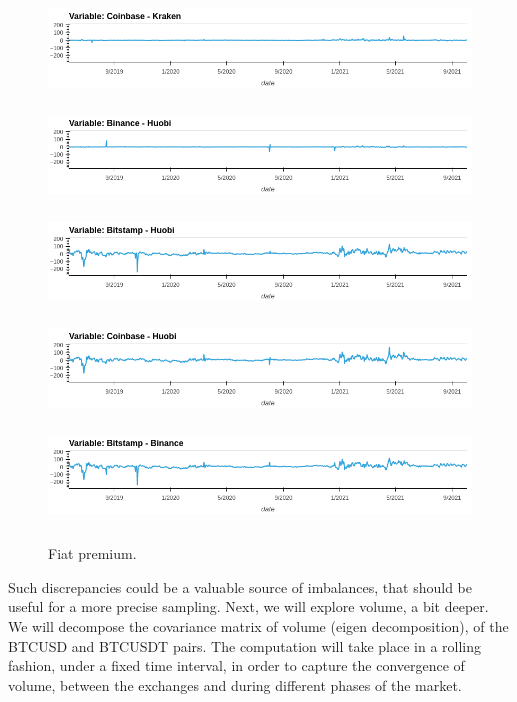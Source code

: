 \documentclass[10pt]{asme2ej}
\begin{document}
\begin{figure}[H]
	\centering
	\includegraphics[width=12cm, height = 2.7cm]{pre1.png} \\
	\includegraphics[width=12cm, height = 2.7cm]{pre2.png} \\
	\includegraphics[width=12cm, height = 2.7cm]{pre3.png} \\
	\includegraphics[width=12cm, height = 2.7cm]{pre4.png} \\
	\includegraphics[width=12cm, height = 2.7cm]{pre5.png} \\
	\caption{Fiat premium.}
	\label{fig:premium}
\end{figure}


Such discrepancies could be a valuable source of imbalances, that should be useful for a more precise sampling. Next, we will explore volume, a bit deeper. We will decompose the covariance matrix of volume (eigen decomposition), of the BTCUSD
and BTCUSDT pairs. The computation will take place in a rolling fashion, under a fixed time interval, in order to capture the convergence of volume, between the exchanges and during different phases of the market.
\end{document}
